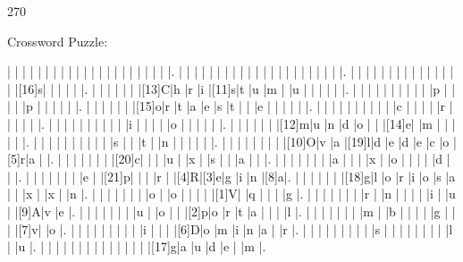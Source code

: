 \documentclass[12pt]{article}
\begin{document}
\pagestyle{fancy}
\fancyhf{}
\renewcommand{\headrulewidth}{0pt}
\renewcommand{\footrulewidth}{0pt}
\libertine
\renewcommand\PuzzleClueFont{\rm\normalsize}
\noindent\begin{rotate}{0}
\small
\end{rotate}
\hfill
\begin{rotate}{270}
\small
\end{rotate}
\begin{center}
  \huge{Crossword Puzzle:}
\end{center}
\vspace{1.5cm}
\begin{Puzzle}{22}{24}
  |{}  |{}  |{}  |{}  |{}  |{}  |{}  |{}  |{}  |{}  |{}  |{}  |{}  |{}  |{}  |{}  |{}  |{}  |{}  |{}  |{}  |.
  |{}  |{}  |{}  |{}  |{}  |{}  |{}  |{}  |{}  |{}  |{}  |{}  |{}  |{}  |{}  |{}  |{}  |{}  |{}  |{}  |{}  |.
  |{}  |{}  |{}  |{}  |{}  |{}  |{}  |{}  |{}  |{}  |{}  |{}  |{}  |{}  |{}  |[16]s|{}  |{}  |{}  |{}  |{}  |.
  |{}  |{}  |{}  |{}  |{}  |{}  |[13]C|h   |r   |i   |[11]s|t   |u   |m   |{}  |u   |{}  |{}  |{}  |{}  |{}  |.
  |{}  |{}  |{}  |{}  |{}  |{}  |{}  |{}  |{}  |{}  |p   |{}  |{}  |{}  |{}  |p   |{}  |{}  |{}  |{}  |{}  |.
  |{}  |{}  |{}  |{}  |{}  |{}  |[15]o|r   |t   |a   |e   |s   |t   |{}  |{}  |e   |{}  |{}  |{}  |{}  |{}  |.
  |{}  |{}  |{}  |{}  |{}  |{}  |{}  |{}  |{}  |{}  |c   |{}  |{}  |{}  |{}  |r   |{}  |{}  |{}  |{}  |{}  |.
  |{}  |{}  |{}  |{}  |{}  |{}  |{}  |{}  |{}  |{}  |i   |{}  |{}  |{}  |{}  |o   |{}  |{}  |{}  |{}  |{}  |.
  |{}  |{}  |{}  |{}  |{}  |{}  |[12]m|u   |n   |d   |o   |{}  |{}  |[14]e|{}  |m   |{}  |{}  |{}  |{}  |{}  |.
  |{}  |{}  |{}  |{}  |{}  |{}  |{}  |{}  |{}  |{}  |s   |{}  |{}  |t   |{}  |n   |{}  |{}  |{}  |{}  |{}  |.
  |{}  |{}  |{}  |{}  |{}  |{}  |{}  |{}  |[10]O|v   |a   |[19]l|d   |e   |d   |e   |c   |o   |[5]r|a   |{}  |.
  |{}  |{}  |{}  |{}  |{}  |{}  |{}  |[20]c|{}  |{}  |{}  |u   |{}  |x   |{}  |s   |{}  |{}  |a   |{}  |{}  |.
  |{}  |{}  |{}  |{}  |{}  |{}  |{}  |a   |{}  |{}  |{}  |x   |{}  |o   |{}  |{}  |{}  |{}  |d   |{}  |{}  |.
  |{}  |{}  |{}  |{}  |{}  |{}  |{}  |e   |{}  |[21]p|{}  |{}  |{}  |r   |{}  |[4]R|[3]e|g   |i   |n   |[8]a|.
  |{}  |{}  |{}  |{}  |{}  |{}  |[18]g|l   |o   |r   |i   |o   |s   |a   |{}  |{}  |x   |{}  |x   |{}  |n   |.
  |{}  |{}  |{}  |{}  |{}  |{}  |{}  |o   |{}  |o   |{}  |{}  |{}  |{}  |[1]V|{}  |q   |{}  |{}  |{}  |g   |.
  |{}  |{}  |{}  |{}  |{}  |{}  |{}  |r   |{}  |n   |{}  |{}  |{}  |{}  |i   |{}  |u   |{}  |[9]A|v   |e   |.
  |{}  |{}  |{}  |{}  |{}  |{}  |{}  |u   |{}  |o   |{}  |{}  |[2]p|o   |r   |t   |a   |{}  |{}  |{}  |l   |.
  |{}  |{}  |{}  |{}  |{}  |{}  |{}  |m   |{}  |b   |{}  |{}  |{}  |{}  |g   |{}  |{}  |{}  |[7]v|{}  |o   |.
  |{}  |{}  |{}  |{}  |{}  |{}  |{}  |{}  |{}  |i   |{}  |{}  |{}  |[6]D|o   |m   |i   |n   |a   |{}  |r   |.
  |{}  |{}  |{}  |{}  |{}  |{}  |{}  |{}  |{}  |s   |{}  |{}  |{}  |{}  |{}  |{}  |{}  |{}  |l   |{}  |u   |.
  |{}  |{}  |{}  |{}  |{}  |{}  |{}  |{}  |{}  |{}  |{}  |{}  |{}  |{}  |[17]g|a   |u   |d   |e   |{}  |m   |.
\end{Puzzle}
\end{document}
